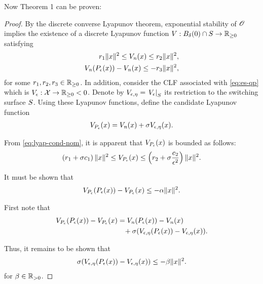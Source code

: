 \documentclass[twocolumn]{article}
\begin{document}
Now Theorem 1 can be proven:
\begin{proof}
  By the discrete converse Lyapunov theorem, exponential stability of $\Orbit$ implies the existence of a discrete Lyapunov function $\V : B_{\delta}(0) \cap \S \to \Rnn$ satisfying
  \begin{align}
    \nonumber
    r_{1} \| x \|^{2} \leq \Vn(x) \leq r_{2} \| x \|^2,\\
    \Vn(\Pe(x)) - \Vn(x) \leq -r_{3} \| x \|^{2},
    \label{eq:lyap-cond-nom}
  \end{align}
  for some $r_{1}, r_{2}, r_{3} \in \Rnn$.
  In addition, consider the CLF associated with \eqref{eq:es-qp} which is $\Ve : \X \to \Rnn < 0$.
  Denote by $\Vee = \VeS$ its restriction to the switching surface $\S$.
  Using these Lyapunov functions, define the candidate Lyapunov function
  \begin{align}
    \VP(x) = \Vn(x) + \sigma \Vee(x).
  \end{align}

  From \eqref{eq:lyap-cond-nom}, it is apparent that $\VP(x)$ is bounded as follows:
  \begin{align}
    \left( r_{1} + \sigma c_{1} \right) \| x \|^{2} \leq \VP(x) \leq \left( r_{2} + \sigma \frac{c_{2}}{\epsilon^{2}}  \right) \| x \|^{2}.
  \end{align}

  It must be shown that
  \begin{align}
    \VP(\Pe(x)) - \VP(x) \leq -\alpha \| x \|^{2}.
  \end{align}

  First note that
  \begin{align}
    \VP(\Pe(x)) - \VP(x) = \Vn(\Pe(x)) - \Vn(x) \hspace{1.2cm}\\
    \nonumber
    \mbox{} + \sigma(\Vee(\Pe(x)) - \Vee(x)).
  \end{align}

  Thus, it remains to be shown that
  \begin{align}
    \sigma(\Vee(\Pe(x)) - \Vee(x)) \leq -\beta \| x \|^{2}.
  \end{align}
  for $\beta \in \Rpd$.

\end{proof}
\end{document}
